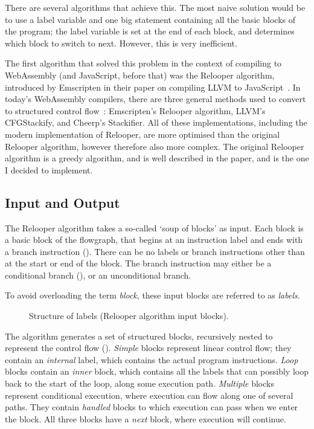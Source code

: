 \documentclass[00-main.tex]{subfiles}
\begin{document}
There are several algorithms that achieve this.
The most naive solution would be to use a label variable and one big  statement containing all the basic blocks of the program; the label variable is set at the end of each block, and determines which block to switch to next. However, this is very inefficient.

The first algorithm that solved this problem in the context of compiling to WebAssembly (and JavaScript, before that) was the Relooper algorithm, introduced by Emscripten in their paper on compiling LLVM to JavaScript~.
In today's WebAssembly compilers, there are three general methods used to convert to structured control flow~: Emscripten's Relooper algorithm, LLVM's CFGStackify, and Cheerp's Stackifier.
All of these implementations, including the modern implementation of Relooper, are more optimised than the original Relooper algorithm, however therefore also more complex.
The original Relooper algorithm is a greedy algorithm, and is well described in the paper, and is the one I decided to implement.

\subsection{Input and Output}

The Relooper algorithm takes a so-called `soup of blocks' as input.
Each block is a basic block of the flowgraph, that begins at an instruction label and ends with a branch instruction ().
There can be no labels or branch instructions other than at the start or end of the block.
The branch instruction may either be a conditional branch (), or an unconditional branch.

To avoid overloading the term \emph{block}, these input blocks are referred to as \emph{labels}.


\begin{figure}[t]
  \centering
  \caption{Structure of labels (Relooper algorithm input blocks).}
  \label{fig:relooper input label structure} %
\end{figure}

The algorithm generates a set of structured blocks, recursively nested to represent the control flow ().
\emph{Simple} blocks represent linear control flow; they contain an \emph{internal} label, which contains the actual program instructions.
\emph{Loop} blocks contain an \emph{inner} block, which contains all the labels that can possibly loop back to the start of the loop, along some execution path.
\emph{Multiple} blocks represent conditional execution, where execution can flow along one of several paths.
They contain \emph{handled} blocks to which execution can pass when we enter the block.
All three blocks have a \emph{next} block, where execution will continue.
\end{document}
